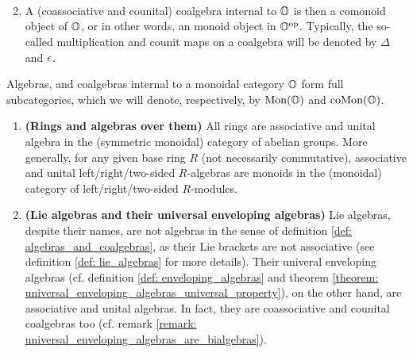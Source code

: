 \begin{definition}
\begin{enumerate}
$$\begin{tikzcd}
                                \end{tikzcd}
                            $$
                        \item A (coassociative and counital) coalgebra internal to $\mathbb{O}$ is then a comonoid object of $\mathbb{O}$, or in other words, an monoid object in $\mathbb{O}^{\mathrm{op}}$. Typically, the so-called multiplication and counit maps on a coalgebra will be denoted by $\Delta$ and $\epsilon$.
                    \end{enumerate}
                Algebras, and coalgebras internal to a monoidal category $\mathbb{O}$ form full subcategories, which we will denote, respectively, by $\mathrm{Mon}(\mathbb{O})$ and $\mathrm{co}\mathrm{Mon}(\mathbb{O})$.
            \end{definition}
            \begin{example}
                \noindent
                \begin{enumerate}
                    \item \textbf{(Rings and algebras over them)} All rings are associative and unital algebra in the (symmetric monoidal) category of abelian groups. More generally, for any given base ring $R$ (not necessarily commutative), associative and unital left/right/two-sided $R$-algebras are monoids in the (monoidal) category of left/right/two-sided $R$-modules.
                    \item \textbf{(Lie algebras and their universal enveloping algebras)} Lie algebras, despite their names, are not algebras in the sense of definition \ref{def: algebras_and_coalgebras}, as their Lie brackets are not associative (see definition \ref{def: lie_algebras} for more details). Their univeral enveloping algebras (cf. definition \ref{def: enveloping_algebras} and theorem \ref{theorem: universal_enveloping_algebras_universal_property}), on the other hand, are associative and unital algebras. In fact, they are coassociative and counital coalgebras too (cf. remark \ref{remark: universal_enveloping_algebras_are_bialgebras}). 
                \end{enumerate}
            \end{example}
        
